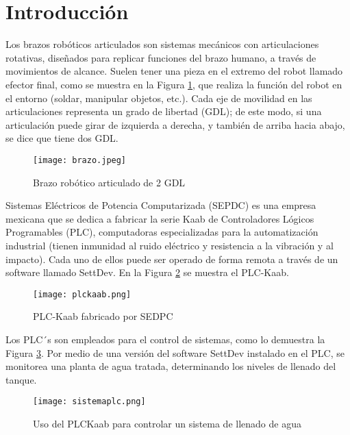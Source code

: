 \section{Introducci\'on}

Los brazos robóticos articulados son sistemas mecánicos con articulaciones rotativas, diseñados para replicar funciones del brazo humano, a través de movimientos de alcance. Suelen tener una pieza en el extremo del robot llamado efector final, como se muestra en la Figura \ref{fig:brazoR}, que realiza la función del robot en el entorno (soldar, manipular objetos, etc.). Cada eje de movilidad en las articulaciones representa un grado de libertad (GDL); de este modo, si una articulación puede girar de izquierda a derecha, y también de arriba hacia abajo, se dice que tiene dos GDL.

\vspace{1cm}

\begin{figure}[htb]
	\centering
	\texttt{[image: brazo.jpeg]}
	\caption{Brazo robótico articulado de 2 GDL}
	\label{fig:brazoR}
\end{figure}

\newpage
Sistemas Eléctricos de Potencia Computarizada (SEPDC) es una empresa mexicana que se dedica a fabricar la serie Kaab de Controladores Lógicos Programables (PLC), computadoras especializadas para la automatización industrial (tienen inmunidad al ruido eléctrico y resistencia a la vibración y al impacto). Cada uno de ellos puede ser operado de forma remota a través de un software llamado SettDev. En la Figura \ref{fig:plc} se muestra el PLC-Kaab.

\begin{figure}[htb]
	\centering
	\texttt{[image: plckaab.png]}
	\caption{PLC-Kaab fabricado por SEDPC}
	\label{fig:plc}
\end{figure}

Los PLC´s son empleados para el control de sistemas, como lo demuestra la Figura \ref{fig:siscritico}. Por medio de una versión del software SettDev instalado en el PLC, se monitorea una planta de agua tratada, determinando los niveles de llenado del tanque.

\begin{figure}[htb]
	\centering
	\texttt{[image: sistemaplc.png]}
	\caption{Uso del PLCKaab para controlar un sistema de llenado de agua}
	\label{fig:siscritico}
\end{figure}